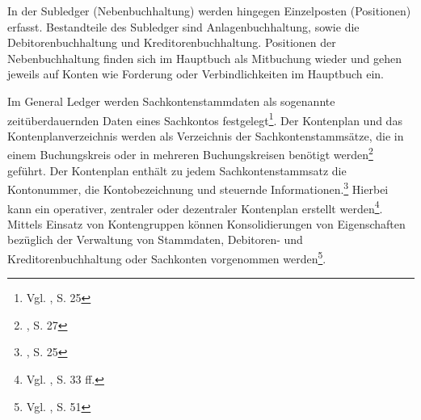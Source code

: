 In der Subledger (Nebenbuchhaltung) werden hingegen Einzelposten (Positionen) erfasst. Bestandteile des Subledger sind Anlagenbuchhaltung, sowie die Debitorenbuchhaltung und Kreditorenbuchhaltung. Positionen der Nebenbuchhaltung finden sich im Hauptbuch als Mitbuchung wieder und gehen jeweils auf Konten wie Forderung oder Verbindlichkeiten im Hauptbuch ein.

Im General Ledger werden Sachkontenstammdaten als sogenannte zeitüberdauernden Daten eines Sachkontos festgelegt\footnote{Vgl. \cite{SAPGL2001}, S. 25}. Der Kontenplan und das Kontenplanverzeichnis werden als Verzeichnis der \glqq […]Sachkontenstammsätze, die in einem Buchungskreis oder in mehreren Buchungskreisen benötigt werden\grqq \footnote{\cite{SAPGL2001}, S. 27} geführt. \glqq Der Kontenplan enthält zu jedem Sachkontenstammsatz die Kontonummer, die Kontobezeichnung und steuernde Informationen.\grqq \footnote{\cite{SAPGL2001}, S. 25} Hierbei kann ein operativer, zentraler oder dezentraler Kontenplan erstellt werden\footnote{Vgl. \cite{SAPGL2001}, S. 33 ff.}. Mittels Einsatz von Kontengruppen können Konsolidierungen von Eigenschaften bezüglich der Verwaltung von Stammdaten, Debitoren- und Kreditorenbuchhaltung oder Sachkonten vorgenommen werden\footnote{Vgl. \cite{Schuler2006}, S. 51}.


